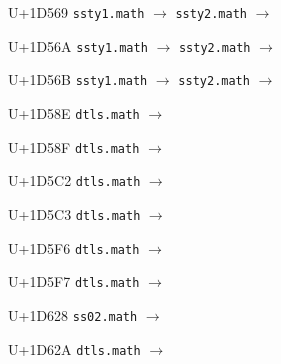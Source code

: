 \documentclass{article}
\begin{document}
\begin{substitutions}
\goodbreak

U+1D569  \linebreak
    \texttt{ssty1.math} $\to$  \linebreak
    \texttt{ssty2.math} $\to$  

\goodbreak

U+1D56A  \linebreak
    \texttt{ssty1.math} $\to$  \linebreak
    \texttt{ssty2.math} $\to$  

\goodbreak

U+1D56B  \linebreak
    \texttt{ssty1.math} $\to$  \linebreak
    \texttt{ssty2.math} $\to$  

\goodbreak

U+1D58E  \linebreak
    \texttt{dtls.math} $\to$  

\goodbreak

U+1D58F  \linebreak
    \texttt{dtls.math} $\to$  

\goodbreak

U+1D5C2  \linebreak
    \texttt{dtls.math} $\to$  

\goodbreak

U+1D5C3  \linebreak
    \texttt{dtls.math} $\to$  

\goodbreak

U+1D5F6  \linebreak
    \texttt{dtls.math} $\to$  

\goodbreak

U+1D5F7  \linebreak
    \texttt{dtls.math} $\to$  

\goodbreak

U+1D628  \linebreak
    \texttt{ss02.math} $\to$  

\goodbreak

U+1D62A  \linebreak
    \texttt{dtls.math} $\to$  


\end{substitutions}
\end{document}
